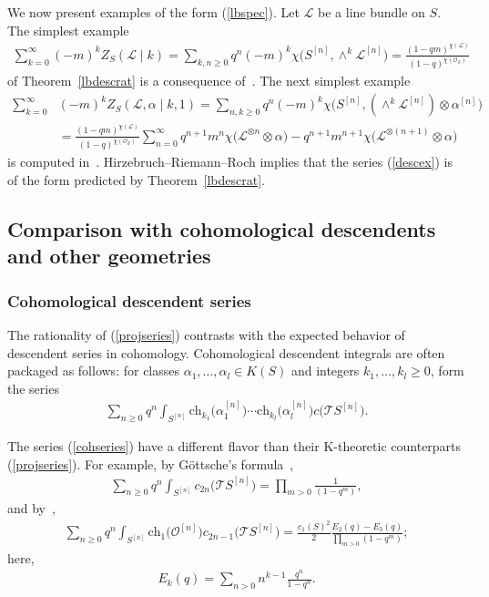 \documentclass[pdftex]{sigma}
\numberwithin{equation}{section}
\newcommand{\ch}{\mathrm{ch}}
\begin{document}
We now present examples of the form (\ref{lbspec}). Let $\mathcal{L}$ be a line bundle on $S$. The simplest example
\begin{gather*}
\sum_{k=0}^{\infty} (-m)^kZ_{S}(\mathcal{L}\mid k)
=\sum_{k,n\geq 0} q^n(-m)^k\chi\big(S^{[n]},\wedge^{k}\mathcal{L}^{[n]}\big)
=\frac{(1-qm)^{\chi(\mathcal{L})}}{(1-q)^{\chi(\mathcal{O}_S)}}
\end{gather*}
of Theorem~\ref{lbdescrat} is a consequence of~\cite[Theorem~5.2.1]{Sc1}.
The next simplest example
{\samepage\begin{align}\label{descex}
\sum_{k=0}^{\infty} &(-m)^kZ_{S}(\mathcal{L},\alpha\mid k,1)= \sum_{n,k\geq 0} q^n(-m)^k \chi\big(S^{[n]},(\wedge^{k}\mathcal{L}^{[n]}) \otimes \alpha^{[n]}\big)\nonumber
\\
&=\frac{(1-qm)^{\chi(\mathcal{L})}}{(1-q)^{\mathcal{\chi(\mathcal{O}_S)}}} \sum_{n=0}^{\infty}q^{n+1}m^n\chi\big(\mathcal{L}^{\otimes n}\otimes \alpha\big)-q^{n+1}m^{n+1}\chi\big(\mathcal{L}^{\otimes (n+1)}\otimes \alpha\big)
\end{align}}%
is computed in~\cite[Proposition 20]{AJLOP}. Hirzebruch--Riemann--Roch implies that the series (\ref{descex}) is of the form predicted by Theorem~\ref{lbdescrat}.


\subsection{Comparison with cohomological descendents and other geometries}
\subsubsection{Cohomological descendent series}
The rationality of (\ref{projseries}) contrasts with the expected behavior of descendent series in cohomology. Cohomological descendent integrals are often packaged as follows: for classes $\alpha_1,\dots,\alpha_l\in K(S)$ and integers $k_1,\dots,k_l\geq 0$, form the series \begin{align}\label{cohseries}
\sum_{n\geq 0} q^n\int_{S^{[n]}} \ch_{k_1}\big(\alpha_1^{[n]}\big)\cdots \ch_{k_l}\big(\alpha_l^{[n]}\big) c\big(\mathcal{T}S^{[n]}\big).
\end{align}

The series (\ref{cohseries}) have a different flavor than their K-theoretic counterparts (\ref{projseries}). For example, by G\"{o}ttsche's formula~\cite[Theorem~0.1]{G},
\begin{gather*}
\sum_{n\geq 0} q^{n} \int_{S^{[n]}} c_{2n}\big(\mathcal{T}S^{[n]}\big)=\prod_{m>0} \frac{1}{(1-q^m)},
\end{gather*}
and by~\cite[Corollary 3]{CO},
\begin{gather*}
\sum_{n\geq 0}q^{n} \int_{S^{[n]}} \ch_{1}\big(\mathcal{O}^{[n]}\big)c_{2n-1}\big(\mathcal{T}S^{[n]}\big)=\frac{c_1(S)^2}{2} \frac{E_2(q)-E_3(q)}{\prod_{m>0}(1-q^m) };
\end{gather*}
here,
\begin{gather*}
E_k(q)=\sum_{n> 0} n^{k-1} \frac{q^n}{1-q^{n}}.
\end{gather*}
\end{document}

